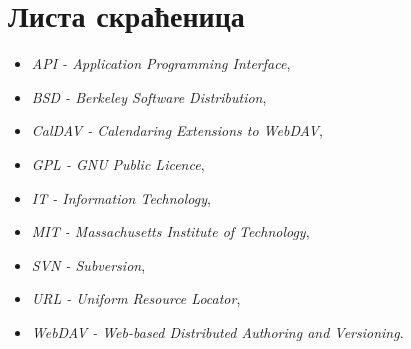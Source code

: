 \chapter*{Листа скраћеница}

\begin{itemize}
	\item{\textit{API - Application Programming Interface}},
	\item{\textit{BSD - Berkeley Software Distribution}},
	\item{\textit{CalDAV - Calendaring Extensions to WebDAV}},
	\item{\textit{GPL - GNU Public Licence}},
	\item{\textit{IT - Information Technology}},
	\item{\textit{MIT - Massachusetts Institute of Technology}},
	\item{\textit{SVN - Subversion}},
	\item{\textit{URL - Uniform Resource Locator}},
	\item{\textit{WebDAV - Web-based Distributed Authoring and Versioning}}.
\end{itemize}